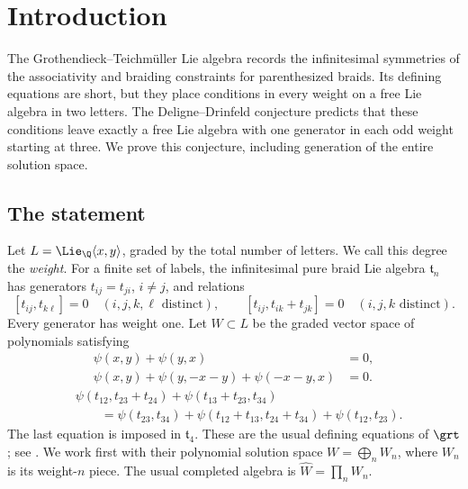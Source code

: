 \section{Introduction}\label{sec:introduction}

The Grothendieck--Teichm\"uller Lie algebra records the infinitesimal
symmetries of the associativity and braiding constraints for
parenthesized braids.  Its defining equations are short, but they place
conditions in every weight on a free Lie algebra in two letters.
The Deligne--Drinfeld conjecture predicts that these conditions leave
exactly a free Lie algebra with one generator in each odd weight
starting at three.  We prove this conjecture, including generation of
the entire solution space.

\subsection{The statement}
Let \(L=\Lie_{\Q}\langle x,y\rangle\), graded by the total number of
letters.  We call this degree the \emph{weight}.  For a finite set of
labels, the infinitesimal pure braid Lie algebra \(\mathfrak t_n\)
has generators \(t_{ij}=t_{ji}\), \(i\ne j\), and relations
\begin{equation}\label{eq:braid-relations}
 [t_{ij},t_{k\ell}]=0\quad(i,j,k,\ell\text{ distinct}),\qquad
 [t_{ij},t_{ik}+t_{jk}]=0\quad(i,j,k\text{ distinct}).
\end{equation}
Every generator has weight one.
Let \(W\subset L\) be the graded vector space of polynomials satisfying
\begin{align}
 \psi(x,y)+\psi(y,x)&=0,\label{eq:antisymmetry}\\
 \psi(x,y)+\psi(y,-x-y)+\psi(-x-y,x)&=0.\label{eq:three-term}
\end{align}
\begin{equation}\label{eq:pentagon}
\begin{aligned}
 &\psi(t_{12},t_{23}+t_{24})+\psi(t_{13}+t_{23},t_{34})\\
 &\qquad=
 \psi(t_{23},t_{34})+\psi(t_{12}+t_{13},t_{24}+t_{34})
 +\psi(t_{12},t_{23}).
\end{aligned}
\end{equation}
The last equation is imposed in \(\mathfrak t_4\).
These are the usual defining equations of \(\grt\);
see \cite[Section~6.1]{Willwacher}.  We work first with their polynomial
solution space \(W=\bigoplus_n W_n\), where \(W_n\) is its weight-\(n\)
piece.  The usual completed algebra is \(\widehat W=\prod_n W_n\).

